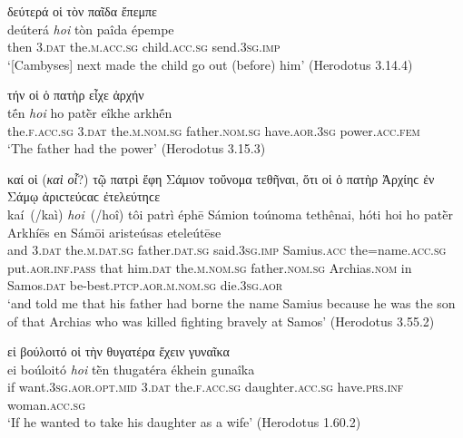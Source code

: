 \begin{exe}
\ex δεύτερά {οἱ τὸν παῖδα} ἔπεμπε\\
\gll deúterá \emph{hoi} {tòn} {paîda} épempe\\
then \textsc{3.dat} the.\textsc{m.acc.sg} child.\textsc{acc.sg} send.\textsc{3sg.imp}\\
\trans `{[}Cambyses{]} next made the child go out (before) him' (Herodotus 3.14.4)
\label{genOiPre3}
\end{exe}

\begin{exe}
\ex τήν {οἱ ὁ πατὴρ} εἶχε ἀρχήν\\
\gll tḗn \emph{hoi} {ho} {patḕr} eîkhe arkhḗn\\
the.\textsc{f.acc.sg} \textsc{3.dat} the.\textsc{m.nom.sg} father.\textsc{nom.sg} have.\textsc{aor.3sg} power.\textsc{acc.fem}\\
\trans `The father had the power' (Herodotus 3.15.3)
\label{genOiPre4}
\end{exe}

\begin{exe}
\ex καί {οἱ} (\emph{καὶ οἷ}?) {τῷ πατρὶ} ἔφη Σάμιον τοὔνομα τεθῆναι, ὅτι {οἱ ὁ πατὴρ} Ἀρχίηϲ ἐν Σάμῳ ἀριϲτεύϲαϲ ἐτελεύτηϲε\\
\gll kaí~(/kaì) \emph{hoi}~(/hoî) {tôi} {patrì} éphē Sámion toúnoma tethênai, hóti {hoi} {ho} {patḕr} Arkhíēs en Sámōi aristeúsas eteleútēse\\
and \textsc{3.dat} the.\textsc{m.dat.sg} father.\textsc{dat.sg} said.\textsc{3sg.imp} Samius.\textsc{acc} the=name.\textsc{acc.sg} put.\textsc{aor.inf.pass} that him.\textsc{dat} the.\textsc{m.nom.sg} father.\textsc{nom.sg} Archias.\textsc{nom} in Samos.\textsc{dat} be-best.\textsc{ptcp.aor.m.nom.sg} die.\textsc{3sg.aor}\\
\trans `and told me that his father had borne the name Samius because he was the son of that Archias who was killed fighting bravely at Samos' (Herodotus 3.55.2)
\label{genOiPre5}
\end{exe}

\begin{exe}
\ex εἰ βούλοιτό {οἱ τὴν θυγατέρα} ἔχειν γυναῖκα\\
\gll ei boúloitó \emph{hoi} tḕn thugatéra ékhein gunaîka\\
if want.\textsc{3sg.aor.opt.mid} \textsc{3.dat} the.\textsc{f.acc.sg} daughter.\textsc{acc.sg} have.\textsc{prs.inf} woman.\textsc{acc.sg}\\
\trans `If he wanted to take his daughter as a wife' (Herodotus 1.60.2)
\label{genOiPre6}
\end{exe}

